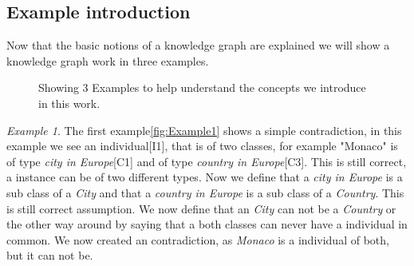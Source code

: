\documentclass{article}
\begin{document}
\subsection{Example introduction}
Now that the basic notions of a knowledge graph are explained we will show a knowledge graph work in three examples. 
\begin{figure}[ht]
	\centering
	\caption{Showing 3 Examples to help understand the concepts we introduce in this work.}
	\label{fig:Antipattern}
\end{figure}

\textit{Example 1}. The first example\ref{fig:Example1} shows a simple contradiction, in this example we see an individual[I1], that is of two classes, for example "Monaco" is of type \textit{city in Europe}[C1] and of type \textit{country in Europe}[C3]. This is still correct, a instance can be of two different types. Now we define that a \textit{city in Europe} is a sub class of a \textit{City} and that a \textit{country in Europe} is a sub class of a \textit{Country}. This is still correct assumption. We now define that an \textit{City} can not be a \textit{Country} or the other way around by saying that a both classes can never have a individual in common. We now created an contradiction, as \textit{Monaco} is a individual of both, but it can not be.\\
\end{document}
